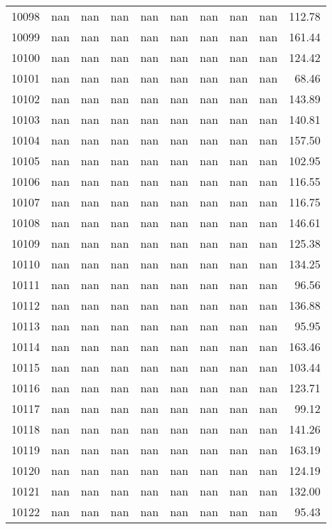 \begin{tabular}{lrrrrrrrrr}
10098 & nan & nan & nan & nan & nan & nan & nan & nan & 112.78 \\
10099 & nan & nan & nan & nan & nan & nan & nan & nan & 161.44 \\
10100 & nan & nan & nan & nan & nan & nan & nan & nan & 124.42 \\
10101 & nan & nan & nan & nan & nan & nan & nan & nan & 68.46 \\
10102 & nan & nan & nan & nan & nan & nan & nan & nan & 143.89 \\
10103 & nan & nan & nan & nan & nan & nan & nan & nan & 140.81 \\
10104 & nan & nan & nan & nan & nan & nan & nan & nan & 157.50 \\
10105 & nan & nan & nan & nan & nan & nan & nan & nan & 102.95 \\
10106 & nan & nan & nan & nan & nan & nan & nan & nan & 116.55 \\
10107 & nan & nan & nan & nan & nan & nan & nan & nan & 116.75 \\
10108 & nan & nan & nan & nan & nan & nan & nan & nan & 146.61 \\
10109 & nan & nan & nan & nan & nan & nan & nan & nan & 125.38 \\
10110 & nan & nan & nan & nan & nan & nan & nan & nan & 134.25 \\
10111 & nan & nan & nan & nan & nan & nan & nan & nan & 96.56 \\
10112 & nan & nan & nan & nan & nan & nan & nan & nan & 136.88 \\
10113 & nan & nan & nan & nan & nan & nan & nan & nan & 95.95 \\
10114 & nan & nan & nan & nan & nan & nan & nan & nan & 163.46 \\
10115 & nan & nan & nan & nan & nan & nan & nan & nan & 103.44 \\
10116 & nan & nan & nan & nan & nan & nan & nan & nan & 123.71 \\
10117 & nan & nan & nan & nan & nan & nan & nan & nan & 99.12 \\
10118 & nan & nan & nan & nan & nan & nan & nan & nan & 141.26 \\
10119 & nan & nan & nan & nan & nan & nan & nan & nan & 163.19 \\
10120 & nan & nan & nan & nan & nan & nan & nan & nan & 124.19 \\
10121 & nan & nan & nan & nan & nan & nan & nan & nan & 132.00 \\
10122 & nan & nan & nan & nan & nan & nan & nan & nan & 95.43 \\

\end{tabular}
